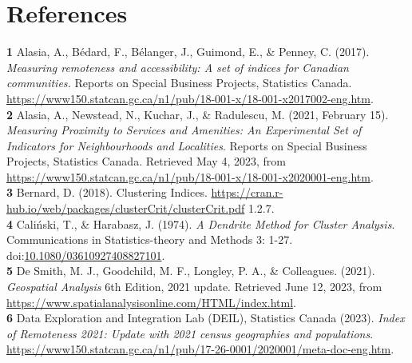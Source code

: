 \documentclass[11pt, a4paper]{article}
\begin{document}
\pagebreak
\section{References}




\noindent\textbf{1} Alasia, A., Bédard, F., Bélanger, J., Guimond, E., \& Penney, C. (2017). \textit{Measuring remoteness and accessibility: A set of indices for Canadian communities.} Reports on Special Business Projects, Statistics Canada. \sloppy\url{https://www150.statcan.gc.ca/n1/pub/18-001-x/18-001-x2017002-eng.htm}. \\

\noindent\textbf{2} Alasia, A., Newstead, N., Kuchar, J., \& Radulescu, M. (2021, February 15). \textit{Measuring Proximity to Services and Amenities: An Experimental Set of Indicators for Neighbourhoods and Localities}. Reports on Special Business Projects, Statistics Canada. Retrieved May 4, 2023, from \sloppy\url{https://www150.statcan.gc.ca/n1/pub/18-001-x/18-001-x2020001-eng.htm}.  \\


\noindent\textbf{3} Bernard, D. (2018). Clustering Indices. \sloppy\url{https://cran.r-hub.io/web/packages/clusterCrit/clusterCrit.pdf} 1.2.7. \\

\noindent\textbf{4} Caliński, T., \& Harabasz, J. (1974). \textit{A Dendrite Method for Cluster Analysis}. Communications in Statistics-theory and Methods 3: 1-27. doi:\sloppy\url{10.1080/03610927408827101}. \\

\noindent\textbf{5} De Smith, M. J., Goodchild, M. F., Longley, P. A., \& Colleagues. (2021). \textit{Geospatial Analysis} 6th Edition, 2021 update. Retrieved June 12, 2023, from \sloppy\url{https://www.spatialanalysisonline.com/HTML/index.html}. \\

\noindent\textbf{6} Data Exploration and Integration Lab (DEIL), Statistics Canada (2023). \textit{Index of Remoteness 2021: Update with 2021 census geographies and populations}. \sloppy\url{https://www150.statcan.gc.ca/n1/pub/17-26-0001/2020001/meta-doc-eng.htm}.\\
\end{document}
